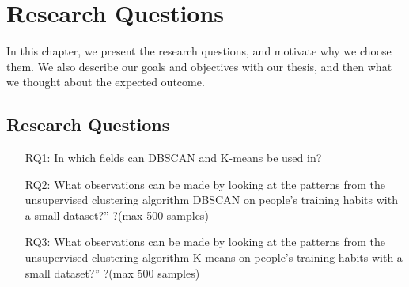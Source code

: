 \documentclass[a4paper]{article}
\begin{document}
\newpage
\section{Research Questions}

In this chapter, we present the research questions, and motivate why we choose them. We also describe our goals and objectives with our thesis, and then what we thought about the expected outcome.

\subsection{Research Questions}
% 
% 
\begin{enumerate}
  \item[RQ1:] In which fields can DBSCAN and K-means be used in?
  \item[RQ2:] What observations can be made by looking at the patterns from the unsupervised clustering algorithm DBSCAN on people's training habits with a small dataset?”
?(max 500 samples)
  \item[RQ3:] What observations can be made by looking at the patterns from the unsupervised clustering algorithm K-means on people's training habits with a small dataset?”
?(max 500 samples)
\end{enumerate}


\end{document}
